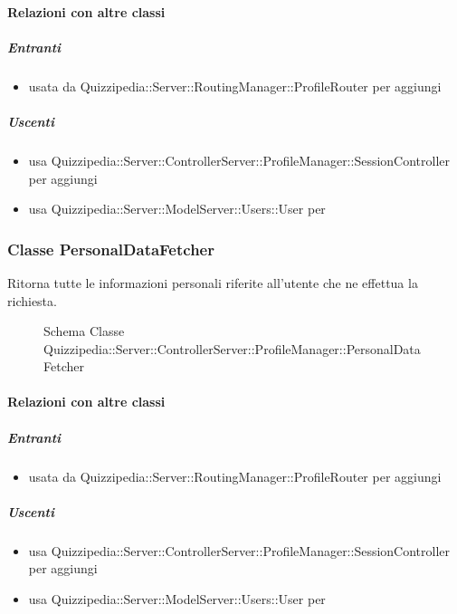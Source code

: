 \paragraph{Relazioni con altre classi}
\subparagraph{Entranti}
\begin{itemize}
\item usata da Quizzipedia::Server::RoutingManager::ProfileRouter per aggiungi
\end{itemize}
\subparagraph{Uscenti}
\begin{itemize}
\item usa Quizzipedia::Server::ControllerServer::ProfileManager::SessionController per aggiungi
\item usa Quizzipedia::Server::ModelServer::Users::User per 
\end{itemize}
\subsubsection{Classe PersonalDataFetcher}
Ritorna tutte le informazioni personali riferite all'utente che ne effettua la richiesta.
\begin{figure}[H]
\centering
\noindent{}
\caption[Schema Classe PersonalDataFetcher]{Schema Classe Quizzipedia::Server::ControllerServer::ProfileManager::PersonalDataFetcher}
\end{figure}
\paragraph{Relazioni con altre classi}
\subparagraph{Entranti}
\begin{itemize}
\item usata da Quizzipedia::Server::RoutingManager::ProfileRouter per aggiungi
\end{itemize}
\subparagraph{Uscenti}
\begin{itemize}
\item usa Quizzipedia::Server::ControllerServer::ProfileManager::SessionController per aggiungi
\item usa Quizzipedia::Server::ModelServer::Users::User per 
\end{itemize}
